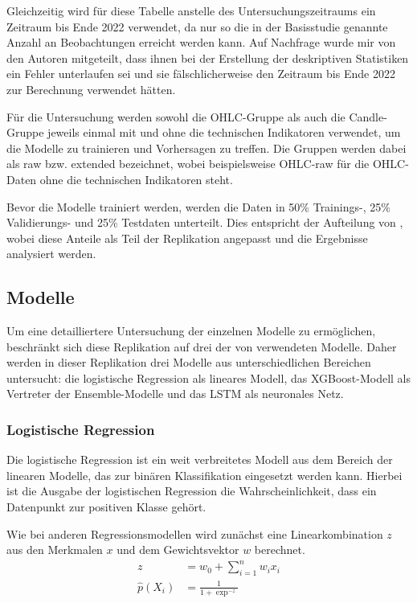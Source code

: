 \documentclass[a4paper, 12pt]{article}
\begin{document}
Gleichzeitig wird für diese Tabelle anstelle des Untersuchungszeitraums ein Zeitraum bis Ende 2022 verwendet, da nur so die in der Basisstudie genannte Anzahl an Beobachtungen erreicht werden kann.
Auf Nachfrage wurde mir von den Autoren mitgeteilt, dass ihnen bei der Erstellung der deskriptiven Statistiken ein Fehler unterlaufen sei und sie fälschlicherweise den Zeitraum bis Ende 2022 zur Berechnung verwendet hätten.
\vspace{\baselineskip}

Für die Untersuchung werden sowohl die OHLC-Gruppe als auch die Candle-Gruppe jeweils einmal mit und ohne die technischen Indikatoren verwendet, um die Modelle zu trainieren und Vorhersagen zu treffen.
Die Gruppen werden dabei als raw bzw. extended bezeichnet, wobei beispielsweise OHLC-raw für die OHLC-Daten ohne die technischen Indikatoren steht.


Bevor die Modelle trainiert werden, werden die Daten in 50\% Trainings-, 25\% Validierungs- und 25\% Testdaten unterteilt.
Dies entspricht der Aufteilung von \textcite{Goutte2023}, wobei diese Anteile als Teil der Replikation angepasst und die Ergebnisse analysiert werden.

\subsection{Modelle}
Um eine detailliertere Untersuchung der einzelnen Modelle zu ermöglichen, beschränkt sich diese Replikation auf drei der von \textcite{Goutte2023} verwendeten Modelle.
Daher werden in dieser Replikation drei Modelle aus unterschiedlichen Bereichen untersucht:
die logistische Regression als lineares Modell, das XGBoost-Modell als Vertreter der Ensemble-Modelle und das LSTM als neuronales Netz. 

\subsubsection{Logistische Regression}
Die logistische Regression ist ein weit verbreitetes Modell aus dem Bereich der linearen Modelle, das zur binären Klassifikation eingesetzt werden kann.
Hierbei ist die Ausgabe der logistischen Regression die Wahrscheinlichkeit, dass ein Datenpunkt zur positiven Klasse gehört.

Wie bei anderen Regressionsmodellen wird zunächst eine Linearkombination $z$ aus den Merkmalen $x$ und dem Gewichtsvektor $w$ berechnet.
\begin{align}
	\label{eq:LR-1}
	z &= w_0 + \sum_{i=1}^n w_i x_i \\
	\label{eq:LR-2}
	\hat p (X_i) &= \frac{1}{1+\exp^{-z}}
\end{align}
\end{document}
